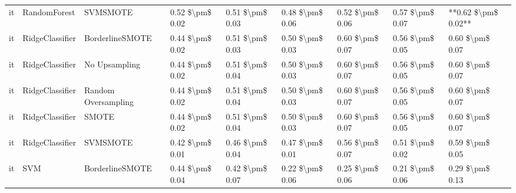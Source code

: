 \begin{tabular}{lllllllll}
      it &                    RandomForest &                      SVMSMOTE & 0.52 \$\textbackslash pm\$ 0.02 &           0.51 \$\textbackslash pm\$ 0.03 &       0.48 \$\textbackslash pm\$ 0.06 &        0.52 \$\textbackslash pm\$ 0.06 &                         0.57 \$\textbackslash pm\$ 0.07 & **0.62 \$\textbackslash pm\$ 0.02** \\
      it &                 RidgeClassifier &               BorderlineSMOTE & 0.44 \$\textbackslash pm\$ 0.02 &           0.51 \$\textbackslash pm\$ 0.03 &       0.50 \$\textbackslash pm\$ 0.03 &        0.60 \$\textbackslash pm\$ 0.07 &                         0.56 \$\textbackslash pm\$ 0.05 &     0.60 \$\textbackslash pm\$ 0.07 \\
      it &                 RidgeClassifier &                 No Upsampling & 0.44 \$\textbackslash pm\$ 0.02 &           0.51 \$\textbackslash pm\$ 0.04 &       0.50 \$\textbackslash pm\$ 0.03 &        0.60 \$\textbackslash pm\$ 0.07 &                         0.56 \$\textbackslash pm\$ 0.05 &     0.60 \$\textbackslash pm\$ 0.07 \\
      it &                 RidgeClassifier &           Random Oversampling & 0.44 \$\textbackslash pm\$ 0.02 &           0.51 \$\textbackslash pm\$ 0.04 &       0.50 \$\textbackslash pm\$ 0.03 &        0.60 \$\textbackslash pm\$ 0.07 &                         0.56 \$\textbackslash pm\$ 0.05 &     0.60 \$\textbackslash pm\$ 0.07 \\
      it &                 RidgeClassifier &                         SMOTE & 0.44 \$\textbackslash pm\$ 0.02 &           0.51 \$\textbackslash pm\$ 0.04 &       0.50 \$\textbackslash pm\$ 0.03 &        0.60 \$\textbackslash pm\$ 0.07 &                         0.56 \$\textbackslash pm\$ 0.05 &     0.60 \$\textbackslash pm\$ 0.07 \\
      it &                 RidgeClassifier &                      SVMSMOTE & 0.42 \$\textbackslash pm\$ 0.01 &           0.46 \$\textbackslash pm\$ 0.04 &       0.47 \$\textbackslash pm\$ 0.01 &        0.56 \$\textbackslash pm\$ 0.07 &                         0.51 \$\textbackslash pm\$ 0.02 &     0.59 \$\textbackslash pm\$ 0.05 \\
      it &                             SVM &               BorderlineSMOTE & 0.44 \$\textbackslash pm\$ 0.04 &           0.42 \$\textbackslash pm\$ 0.07 &       0.22 \$\textbackslash pm\$ 0.06 &        0.25 \$\textbackslash pm\$ 0.06 &                         0.21 \$\textbackslash pm\$ 0.06 &     0.29 \$\textbackslash pm\$ 0.13 \\

\end{tabular}
